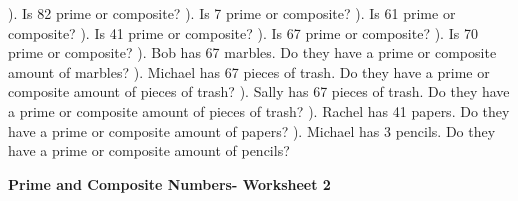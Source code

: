 \documentclass{article}%
\begin{document}
\newline%
\newline%
). Is 82 prime or composite?%
\newline%
\newline%
). Is 7 prime or composite?%
\newline%
\newline%
). Is 61 prime or composite?%
\newline%
\newline%
). Is 41 prime or composite?%
\newline%
\newline%
). Is 67 prime or composite?%
\newline%
\newline%
). Is 70 prime or composite?%
\newline%
\newline%
). Bob has 67 marbles. Do they have a prime or composite amount of marbles?%
\newline%
\newline%
). Michael has 67 pieces of trash. Do they have a prime or composite amount of pieces of trash?%
\newline%
\newline%
). Sally has 67 pieces of trash. Do they have a prime or composite amount of pieces of trash?%
\newline%
\newline%
). Rachel has 41 papers. Do they have a prime or composite amount of papers?%
\newline%
\newline%
). Michael has 3 pencils. Do they have a prime or composite amount of pencils?%
\newline%
\newline%
\newline%
\pagebreak%
\large%
\begin{center}%
\textbf{Prime and Composite Numbers- Worksheet 2}%
\newline%
\newline%
\newline%
\end{center} \normalsize%
\end{document}
